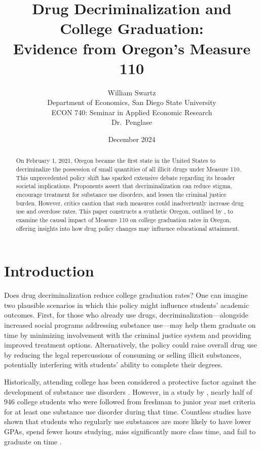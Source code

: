 \documentclass[12pt]{article}
\title{Drug Decriminalization and College Graduation:\\
Evidence from Oregon's Measure 110}
\author{William Swartz\\
\small Department of Economics, San Diego State University\\
\small ECON 740: Seminar in Applied Economic Research\\
\small Dr.\ Penglase}
\date{December 2024}
\begin{document}
\doublespacing

\maketitle

\begin{abstract}
\noindent On February 1, 2021, Oregon became the first state in the United
States to decriminalize the possession of small quantities of all illicit
drugs under Measure 110. This unprecedented policy shift has sparked
extensive debate regarding its broader societal implications. Proponents
assert that decriminalization can reduce stigma, encourage treatment for
substance use disorders, and lessen the criminal justice burden. However,
critics caution that such measures could inadvertently increase drug use
and overdose rates. This paper constructs a synthetic Oregon, outlined by
, to examine the causal impact of Measure 110 on
college graduation rates in Oregon, offering insights into how drug policy
changes may influence educational attainment.
\end{abstract}

\section{Introduction}

Does drug decriminalization reduce college graduation rates? One can
imagine two plausible scenarios in which this policy might influence
students' academic outcomes. First, for those who already use drugs,
decriminalization---alongside increased social programs addressing
substance use---may help them graduate on time by minimizing involvement
with the criminal justice system and providing improved treatment options.
Alternatively, the policy could raise overall drug use by reducing the
legal repercussions of consuming or selling illicit substances, potentially
interfering with students' ability to complete their degrees.

Historically, attending college has been considered a protective factor
against the development of substance use disorders \cite{welsh2019substance}.
However, in a study by , nearly half of 946
college students who were followed from freshman to junior year met
criteria for at least one substance use disorder during that time.
Countless studies have shown that students who regularly use substances are
more likely to have lower GPAs, spend fewer hours studying, miss
significantly more class time, and fail to graduate on time
\cite{welsh2019substance}.
\end{document}
